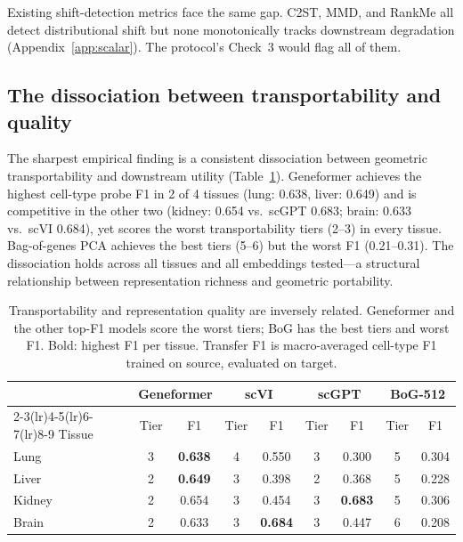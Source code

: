 \documentclass[10pt,letterpaper]{article}
\begin{document}
Existing shift-detection metrics face the same gap. C2ST, MMD, and RankMe all detect distributional shift but none monotonically tracks downstream degradation (Appendix~\ref{app:scalar}). The protocol's Check~3 would flag all of them.


\subsection{The dissociation between transportability and quality}
\label{sec:dissociation}

The sharpest empirical finding is a consistent dissociation between geometric transportability and downstream utility (Table~\ref{tab:dissociation}). Geneformer achieves the highest cell-type probe F1 in 2 of 4 tissues (lung: 0.638, liver: 0.649) and is competitive in the other two (kidney: 0.654 vs.\ scGPT 0.683; brain: 0.633 vs.\ scVI 0.684), yet scores the worst transportability tiers (2--3) in every tissue. Bag-of-genes PCA achieves the best tiers (5--6) but the worst F1 (0.21--0.31). The dissociation holds across all tissues and all embeddings tested---a structural relationship between representation richness and geometric portability.

\begin{table}[t]
\centering
\caption{Transportability and representation quality are inversely related. Geneformer and the other top-F1 models score the worst tiers; BoG has the best tiers and worst F1. Bold: highest F1 per tissue. Transfer F1 is macro-averaged cell-type F1 trained on source, evaluated on target.}
\label{tab:dissociation}
\small
\begin{tabular}{@{}lcccccccc@{}}
\toprule
 & \multicolumn{2}{c}{Geneformer} & \multicolumn{2}{c}{scVI} & \multicolumn{2}{c}{scGPT} & \multicolumn{2}{c}{BoG-512} \\
\cmidrule(lr){2-3}\cmidrule(lr){4-5}\cmidrule(lr){6-7}\cmidrule(lr){8-9}
Tissue & Tier & F1 & Tier & F1 & Tier & F1 & Tier & F1 \\
\midrule
Lung   & 3 & \textbf{0.638} & 4 & 0.550 & 3 & 0.300 & 5 & 0.304 \\
Liver  & 2 & \textbf{0.649} & 3 & 0.398 & 2 & 0.368 & 5 & 0.228 \\
Kidney & 2 & 0.654 & 3 & 0.454 & 3 & \textbf{0.683} & 5 & 0.306 \\
Brain  & 2 & 0.633 & 3 & \textbf{0.684} & 3 & 0.447 & 6 & 0.208 \\
\bottomrule
\end{tabular}
\end{table}
\end{document}

